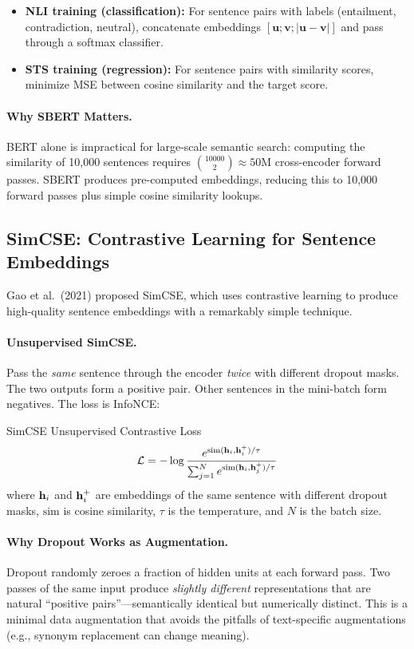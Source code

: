 \begin{itemize}
    \item \textbf{NLI training (classification):}  For sentence pairs with
    labels (entailment, contradiction, neutral), concatenate embeddings
    $[\mathbf{u}; \mathbf{v}; |\mathbf{u} - \mathbf{v}|]$ and pass through a
    softmax classifier.
    \item \textbf{STS training (regression):}  For sentence pairs with
    similarity scores, minimize MSE between cosine similarity and the target
    score.
\end{itemize}

\paragraph{Why SBERT Matters.}
BERT alone is impractical for large-scale semantic search: computing the
similarity of 10,000 sentences requires $\binom{10000}{2} \approx 50$M
cross-encoder forward passes.  SBERT produces pre-computed embeddings,
reducing this to 10,000 forward passes plus simple cosine similarity lookups.

\subsection{SimCSE: Contrastive Learning for Sentence Embeddings}

Gao et al.\ (2021) proposed SimCSE, which uses contrastive learning to produce
high-quality sentence embeddings with a remarkably simple technique.

\paragraph{Unsupervised SimCSE.}
Pass the \emph{same} sentence through the encoder \emph{twice} with different
dropout masks.  The two outputs form a positive pair.  Other sentences in the
mini-batch form negatives.  The loss is InfoNCE:

\begin{mathresult}{SimCSE Unsupervised Contrastive Loss}
\[
    \mathcal{L} = -\log \frac{e^{\text{sim}(\mathbf{h}_i, \mathbf{h}_i^+)/\tau}}
                       {\sum_{j=1}^{N} e^{\text{sim}(\mathbf{h}_i, \mathbf{h}_j^+)/\tau}}
\]
where $\mathbf{h}_i$ and $\mathbf{h}_i^+$ are embeddings of the same sentence with
different dropout masks, $\text{sim}$ is cosine similarity, $\tau$ is the
temperature, and $N$ is the batch size.
\end{mathresult}

\paragraph{Why Dropout Works as Augmentation.}
Dropout randomly zeroes a fraction of hidden units at each forward pass.  Two
passes of the same input produce \emph{slightly different} representations
that are natural ``positive pairs''---semantically identical but numerically
distinct.  This is a minimal data augmentation that avoids the pitfalls of
text-specific augmentations (e.g., synonym replacement can change meaning).

